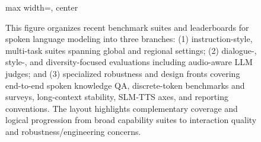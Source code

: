 \begin{figure}[h]
\begin{adjustbox}{max width=\textwidth, center}
\begin{tikzpicture}
\end{tikzpicture}
\end{adjustbox}

\caption{This figure organizes recent benchmark suites and leaderboards for spoken language modeling into three branches: (1) instruction-style, multi-task suites spanning global and regional settings; (2) dialogue-, style-, and diversity-focused evaluations including audio-aware LLM judges; and (3) specialized robustness and design fronts covering end-to-end spoken knowledge QA, discrete-token benchmarks and surveys, long-context stability, SLM-TTS axes, and reporting conventions. The layout highlights complementary coverage and logical progression from broad capability suites to interaction quality and robustness/engineering concerns.}
\label{fig:tiny_tree_figure_8}

\end{figure}